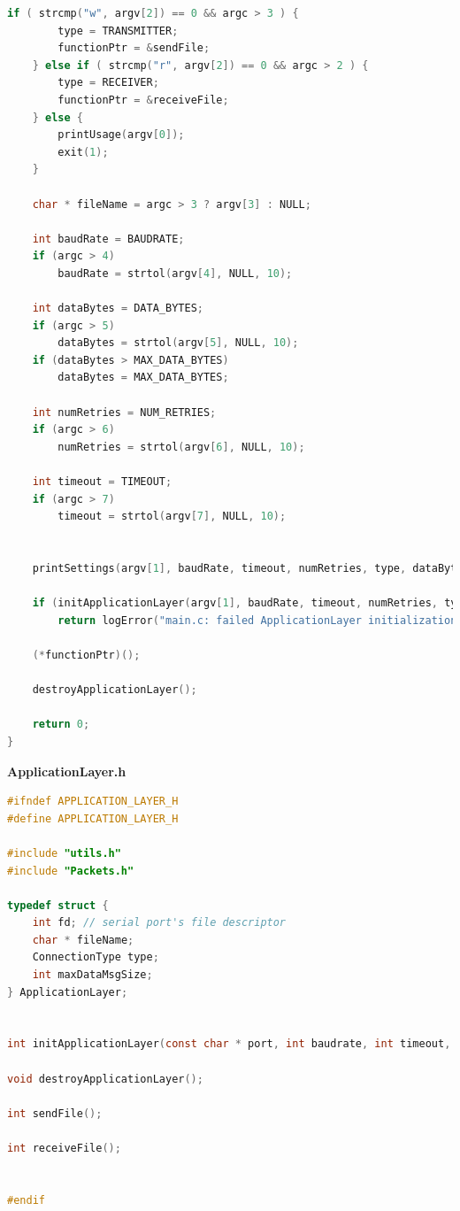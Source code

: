 \documentclass[a4paper, 11pt]{article}
\begin{document}
\begin{lstlisting}[language=C]
	if ( strcmp("w", argv[2]) == 0 && argc > 3 ) {
		type = TRANSMITTER;
		functionPtr = &sendFile;
	} else if ( strcmp("r", argv[2]) == 0 && argc > 2 ) {
		type = RECEIVER;
		functionPtr = &receiveFile;
	} else {
		printUsage(argv[0]);
		exit(1);
	}

	char * fileName = argc > 3 ? argv[3] : NULL;

	int baudRate = BAUDRATE;
	if (argc > 4)
		baudRate = strtol(argv[4], NULL, 10);

	int dataBytes = DATA_BYTES;
	if (argc > 5)
		dataBytes = strtol(argv[5], NULL, 10);
	if (dataBytes > MAX_DATA_BYTES)
		dataBytes = MAX_DATA_BYTES;

	int numRetries = NUM_RETRIES;
	if (argc > 6)
		numRetries = strtol(argv[6], NULL, 10);

	int timeout = TIMEOUT;
	if (argc > 7)
		timeout = strtol(argv[7], NULL, 10);


	printSettings(argv[1], baudRate, timeout, numRetries, type, dataBytes, fileName);

	if (initApplicationLayer(argv[1], baudRate, timeout, numRetries, type, dataBytes, fileName) == ERROR)
		return logError("main.c: failed ApplicationLayer initialization");

	(*functionPtr)();

	destroyApplicationLayer();

	return 0;
}
\end{lstlisting}
\newpage

\huge\textbf{ApplicationLayer.h}
\begin{lstlisting}[language=C]
#ifndef APPLICATION_LAYER_H
#define APPLICATION_LAYER_H

#include "utils.h"
#include "Packets.h"

typedef struct {
    int fd; // serial port's file descriptor
    char * fileName;
    ConnectionType type;
    int maxDataMsgSize;
} ApplicationLayer;


int initApplicationLayer(const char * port, int baudrate, int timeout, int numRetries, ConnectionType type, int maxDataMsgSize, char * file);

void destroyApplicationLayer();

int sendFile();

int receiveFile();


#endif
\end{lstlisting}
\newpage
\end{document}
